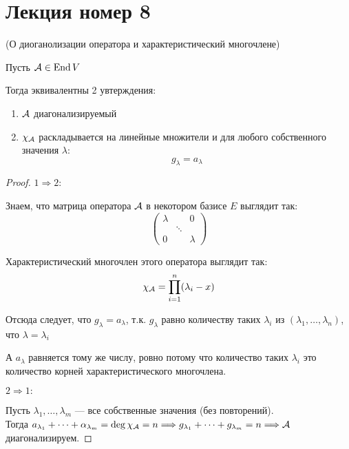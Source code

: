 \section{Лекция номер 8}

\begin{theorem}(О диоганолизации оператора и характеристический многочлене)

    Пусть $\mathcal{A} \in \operatorname{End}{V}$

    Тогда эквивалентны 2 увтерждения:
    \begin{enumerate}
        \item $\mathcal{A}$ диагонализируемый
        \item $\chi_{\mathcal{A}}$ раскладывается на линейные множители
        и для любого собственного значения $\lambda:$
        \[ g_{\lambda} = a_{\lambda} \]
    \end{enumerate}

    \begin{proof} \quad

    \quad$1 \Longrightarrow 2: $

    Знаем, что матрица оператора $\mathcal{A}$ в некотором базисе $E$ выглядит так: 
    \[
        \left(\begin{array}{ccc}
            \lambda &  & 0 \\ 
            & \ddots &  \\ 
            0 &  & \lambda
        \end{array}\right)
    \]

    Характеристический многочлен этого оператора выглядит так:
        \[ \chi_{\mathcal{A}} = \prod_{i = 1}^{n} (\lambda_i - x) \]
    
    Отсюда следует, что $g_{\lambda} = a_{\lambda}$, т.к. $g_{\lambda}$ равно количеству таких $\lambda_i$ из $(\lambda_1, \dots, \lambda_n)$, что $\lambda = \lambda_i$

    А $a_{\lambda}$ равняется тому же числу, ровно потому что количество таких $\lambda_i$ это количество корней характеристического многочлена.

    \quad$2 \Longrightarrow 1: $
    
    Пусть $\lambda_1, \dots, \lambda_m$ --- все собственные значения (без повторений). \\
    Тогда $a_{\lambda_1} + \dots + \alpha_{\lambda_m} = \deg{\chi_{\mathcal{A}}} = n \Longrightarrow g_{\lambda_1} + \dots + g_{\lambda_m} = n \Longrightarrow \mathcal{A}$ диагонализируем.

    \end{proof}
\end{theorem}

